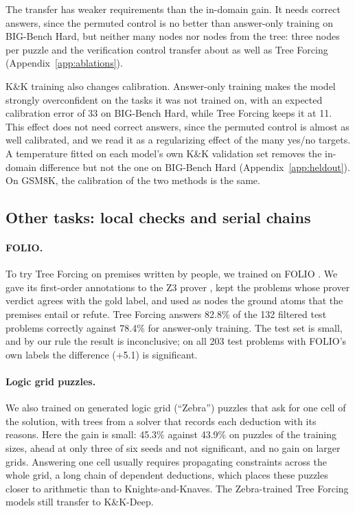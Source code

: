 \documentclass[10pt]{article}
\newcommand{\tf}{Tree Forcing}
\begin{document}
The transfer has weaker requirements than the in-domain gain. It needs correct answers, since the permuted control is
no better than answer-only training on BIG-Bench Hard, but neither many nodes nor nodes from the tree: three nodes per
puzzle and the verification control transfer about as well as \tf{} (Appendix~\ref{app:ablations}).

K\&K training also changes calibration. Answer-only training makes the model strongly overconfident on the tasks it was
not trained on, with an expected calibration error of 33 on BIG-Bench Hard, while \tf{} keeps it at 11. This effect
does not need correct answers, since the permuted control is almost as well calibrated, and we read it as a
regularizing effect of the many yes/no targets. A temperature fitted on each model's own K\&K validation set removes
the in-domain difference but not the one on BIG-Bench Hard (Appendix~\ref{app:heldout}). On GSM8K, the calibration of the two
methods is the same.

\subsection{Other tasks: local checks and serial chains}
\label{sec:zebra}
\label{sec:gsm8k}

\paragraph{FOLIO.} To try \tf{} on premises written by people, we trained on FOLIO \citep{han2022folio}. We gave its
first-order annotations to the Z3 prover \citep{demoura2008z3}, kept the problems whose prover verdict agrees with the
gold label, and used as nodes the ground atoms that the premises entail or refute. \tf{} answers 82.8\% of the 132
filtered test problems correctly against 78.4\% for answer-only training. The test set is small, and by our rule the
result is inconclusive; on all 203 test problems with FOLIO's own labels the difference (+5.1) is significant.

\paragraph{Logic grid puzzles.} We also trained on generated logic grid (``Zebra'') puzzles that ask for one cell of the
solution, with trees from a solver that records each deduction with its reasons. Here the gain is small: 45.3\%
against 43.9\% on puzzles of the training sizes, ahead at only three of six seeds and not significant, and no gain on larger
grids. Answering one cell usually requires
propagating constraints across the whole grid, a long chain of dependent deductions, which places these puzzles closer
to arithmetic than to Knights-and-Knaves. The Zebra-trained \tf{} models still transfer to K\&K-Deep.
\end{document}
